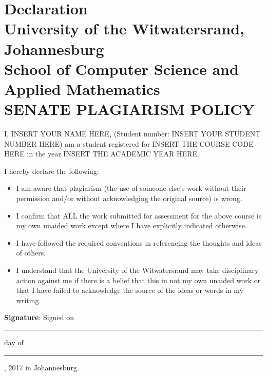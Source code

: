 \documentclass[11pt, a4paper, twoside]{book}
\begin{document}
\frontmatter
 
\pagestyle{plain}
\titleformat{\section}[hang]{\normalfont\Large\bfseries\filcenter}{\thesection}{0pt}{}
\section*{Declaration\\
University of the Witwatersrand, Johannesburg\\
School of Computer Science and Applied Mathematics\\
SENATE PLAGIARISM POLICY}  

I, INSERT YOUR NAME HERE, (Student number: INSERT YOUR STUDENT NUMBER HERE) am a student registered for 
INSERT THE COURSE CODE HERE in the year INSERT THE ACADEMIC YEAR HERE.

I hereby declare the following: 
\begin{itemize}
\item
I am aware that plagiarism (the use of someone else's work without their permission and/or without acknowledging the original source) is wrong. 
\item
I confirm that ALL the work submitted for assessment for the above course is my own unaided work except where I have explicitly indicated otherwise. 
\item
I have followed the required conventions in referencing the 
thoughts and ideas of others.
\item
I understand that the University of the Witwatersrand may take 
disciplinary action against me if there is a belief that this in not my own unaided work or that I have failed to acknowledge the source of the ideas or words in my writing.  
\end{itemize}
\vskip 1cm
\noindent
\textbf{Signature}: 
\hspace{2cm}
\vskip 6mm
\noindent
Signed on \rule{3cm}{0.4pt} day of \rule{3cm}{0.4pt} , 2017 in Johannesburg.

\newpage
 
\newpage

\newpage
\tableofcontents 
{}
\listoffigures 
{}
\listoftables 
{}
\listofalgorithms

\mainmatter
\end{document}
